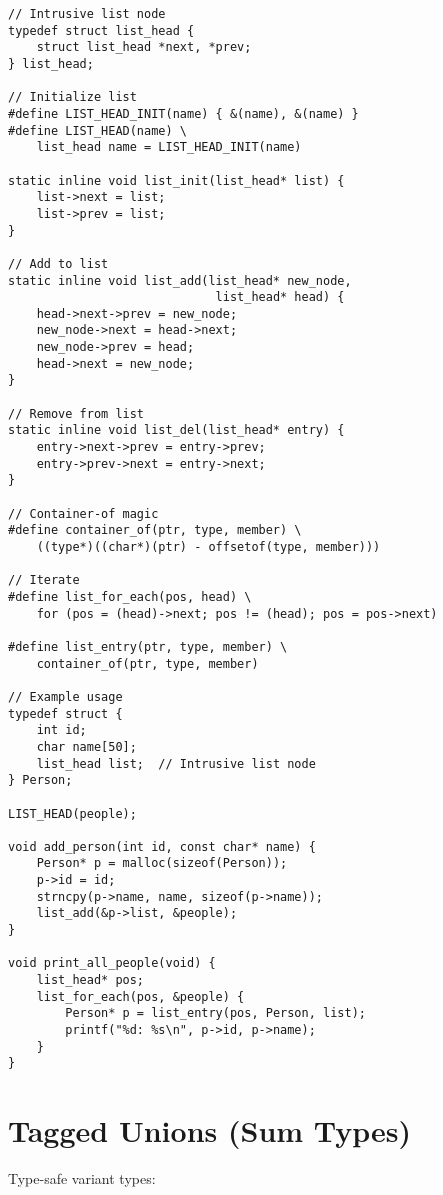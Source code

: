 \begin{lstlisting}
// Intrusive list node
typedef struct list_head {
    struct list_head *next, *prev;
} list_head;

// Initialize list
#define LIST_HEAD_INIT(name) { &(name), &(name) }
#define LIST_HEAD(name) \
    list_head name = LIST_HEAD_INIT(name)

static inline void list_init(list_head* list) {
    list->next = list;
    list->prev = list;
}

// Add to list
static inline void list_add(list_head* new_node,
                             list_head* head) {
    head->next->prev = new_node;
    new_node->next = head->next;
    new_node->prev = head;
    head->next = new_node;
}

// Remove from list
static inline void list_del(list_head* entry) {
    entry->next->prev = entry->prev;
    entry->prev->next = entry->next;
}

// Container-of magic
#define container_of(ptr, type, member) \
    ((type*)((char*)(ptr) - offsetof(type, member)))

// Iterate
#define list_for_each(pos, head) \
    for (pos = (head)->next; pos != (head); pos = pos->next)

#define list_entry(ptr, type, member) \
    container_of(ptr, type, member)

// Example usage
typedef struct {
    int id;
    char name[50];
    list_head list;  // Intrusive list node
} Person;

LIST_HEAD(people);

void add_person(int id, const char* name) {
    Person* p = malloc(sizeof(Person));
    p->id = id;
    strncpy(p->name, name, sizeof(p->name));
    list_add(&p->list, &people);
}

void print_all_people(void) {
    list_head* pos;
    list_for_each(pos, &people) {
        Person* p = list_entry(pos, Person, list);
        printf("%d: %s\n", p->id, p->name);
    }
}
\end{lstlisting}

\section{Tagged Unions (Sum Types)}

Type-safe variant types:

